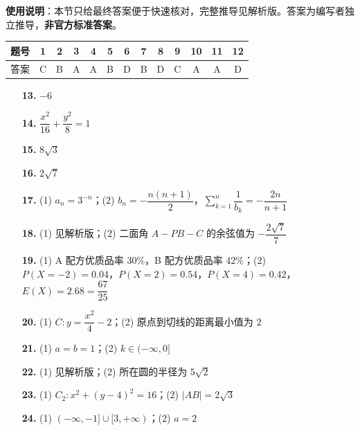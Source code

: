 
\begin{gknotice}
\textbf{使用说明}：本节只给最终答案便于快速核对，完整推导见解析版。答案为编写者独立推导，\textbf{非官方标准答案}。
\end{gknotice}

\begin{center}\begin{tabular}{ccccccccccccc}
\toprule
题号 & 1 & 2 & 3 & 4 & 5 & 6 & 7 & 8 & 9 & 10 & 11 & 12 \\
\midrule
答案 & C & B & A & A & B & D & B & D & C & A & A & D \\
\bottomrule
\end{tabular}\end{center}

\begin{itemize}[leftmargin=2.6em]
  \item[\textbf{13.}] $-6$
  \item[\textbf{14.}] $\dfrac{x^2}{16}+\dfrac{y^2}{8}=1$
  \item[\textbf{15.}] $8\sqrt3$
  \item[\textbf{16.}] $2\sqrt7$
\end{itemize}

\begin{itemize}[leftmargin=2.6em]
  \item[\textbf{17.}] (1) $a_n=3^{-n}$；(2) $b_n=-\dfrac{n(n+1)}2$，$\displaystyle\sum_{k=1}^n\dfrac1{b_k}=-\dfrac{2n}{n+1}$
  \item[\textbf{18.}] (1) 见解析版；(2) 二面角 $A-PB-C$ 的余弦值为 $-\dfrac{2\sqrt7}{7}$
  \item[\textbf{19.}] (1) A 配方优质品率 $30\%$，B 配方优质品率 $42\%$；(2) $P(X=-2)=0.04$，$P(X=2)=0.54$，$P(X=4)=0.42$，$E(X)=2.68=\dfrac{67}{25}$
  \item[\textbf{20.}] (1) $C:y=\dfrac{x^2}{4}-2$；(2) 原点到切线的距离最小值为 $2$
  \item[\textbf{21.}] (1) $a=b=1$；(2) $k\in(-\infty,0]$
  \item[\textbf{22.}] (1) 见解析版；(2) 所在圆的半径为 $5\sqrt2$
  \item[\textbf{23.}] (1) $C_2:x^2+(y-4)^2=16$；(2) $|AB|=2\sqrt3$
  \item[\textbf{24.}] (1) $(-\infty,-1]\cup[3,+\infty)$；(2) $a=2$
\end{itemize}
